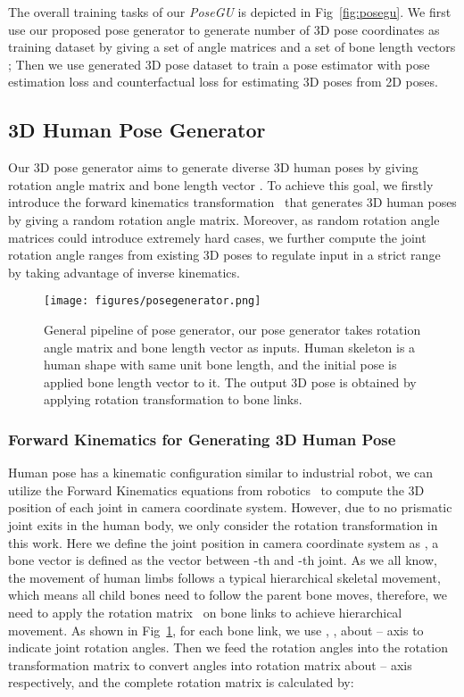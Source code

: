 \documentclass[runningheads]{llncs}
\begin{document}
The overall training tasks of our \textit{PoseGU} is depicted in Fig~\ref{fig:posegu}.
We first use our proposed pose generator  to generate  number of 3D pose coordinates as training dataset  by giving a set of angle matrices  and a set of bone length vectors ; 
Then we use generated 3D pose dataset  to train a pose estimator  with pose estimation loss  and counterfactual loss  for estimating 3D poses from 2D poses. 

\subsection{3D Human Pose Generator}
Our 3D pose generator  aims to generate diverse 3D human poses  by giving rotation angle matrix  and bone length vector . 
To achieve this goal, we firstly introduce the forward kinematics  transformation~\cite{forwardkinematics} that generates 3D human poses by giving a random rotation angle matrix. 
Moreover, as random rotation angle matrices could introduce extremely hard cases, we further compute the joint rotation angle ranges from existing 3D poses to regulate input  in a strict range by taking advantage of inverse kinematics. 

\begin{figure}[h]
    \centering
    \texttt{[image: figures/posegenerator.png]}
    \caption{General pipeline of pose generator, our pose generator  takes rotation angle matrix  and bone length vector  as inputs. Human skeleton is a human shape with same unit bone length, and the initial pose is applied bone length vector to it. The output 3D pose  is obtained by applying rotation transformation to bone links.}
    \label{fig:posegenerator}
\end{figure}

\subsubsection{Forward Kinematics for Generating 3D Human Pose}
Human pose has a kinematic configuration similar to industrial robot, we can utilize the Forward Kinematics equations from robotics~\cite{forwardkinematics} to compute the 3D position of each joint in camera coordinate system. 
However, due to no prismatic joint exits in the human body, we only consider the rotation transformation in this work. 
Here we define the joint position in camera coordinate system as , a bone vector  is defined as the vector between -th and -th joint. 
As we all know, the movement of human limbs follows a typical hierarchical skeletal movement, which means all child bones need to follow the parent bone moves, therefore, we need to apply the rotation matrix~\cite{rotationmatrix} on bone links to achieve hierarchical movement. 
As shown in Fig~\ref{fig:posegenerator}, for each bone link, we use , ,  about -- axis to indicate joint rotation angles. 
Then we feed the rotation angles into the rotation transformation matrix  to convert angles into rotation matrix about -- axis respectively, and the complete rotation matrix is calculated by:
\end{document}
